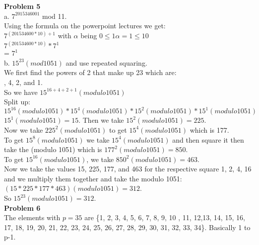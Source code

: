 \documentclass[10pt]{article}
\begin{document}
\noindent \large \textbf{Problem 5}\\
\noindent a. $7^{2015346001}$ mod 11.\\
\indent Using the formula on the powerpoint lectures we get:\\
\indent $7^{(201534600 * 10) + 1}$ with $\alpha$ being $0 \leq 1 \alpha = 1 \leq 10$\\
\indent $7^{(201534600 * 10)} * 7^{1}$\\
\indent = $7^{1}$\\

\noindent b. $15^{23} (mod 1051)$ and use repeated squaring.\\
\indent We first find the powers of 2 that make up 23 which are:\\
, 4, 2, and 1.\\
\indent So we have $15^{16+4+2+1} (modulo 1051)$\\
\indent Split up: $15^{16} (modulo 1051) * 15^{4} (modulo 1051) * 15^{2} (modulo 1051) * 15^{1} (modulo 1051)$\\
\indent $15^{1} (modulo 1051) = 15$. Then we take $15^{2} (modulo 1051) = 225$.\\
\indent Now we take $225^{2} (modulo 1051)$ to get $15^{4} (modulo 1051)$ which is 177.\\
\indent To get $15^{8} (modulo 1051)$ we take $15^{4} (modulo 1051)$ and then square it then take the (modulo 1051) which is $177^{2} (modulo 1051) = 850$.\\
\indent To get $15^{16} (modulo 1051)$, we take $850^{2} (modulo 1051) = 463$.\\
\indent Now we take the values 15, 225, 177, and 463 for the respective square 1, 2, 4, 16 and we multiply them together and take the modulo 1051:\\
\indent $(15 * 225 * 177 * 463) (modulo 1051) = 312$.\\
\indent So $15^{23} (modulo 1051) = 312$.\\ 

\noindent \large \textbf{Problem 6}\\
\indent The elements with $p = 35$ are \{1, 2, 3, 4, 5, 6, 7, 8, 9, 10 , 11, 12,13, 14, 15, 16, 17, 18, 19, 20, 21, 22, 23, 24, 25, 26, 27, 28, 29, 30, 31, 32, 33, 34\}. Basically 1 to p-1.\\
\end{document}
